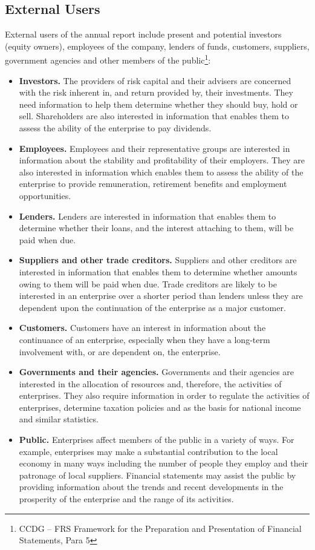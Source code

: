 \subsection{External Users}
External users of the annual report include present and potential investors (equity owners), employees of the company, lenders of funds, customers, suppliers, government agencies and other members of the public\footnote{CCDG – FRS Framework for the Preparation and Presentation of Financial Statements, Para 5}: 
\begin{itemize}
\item \textbf{Investors.} The providers of risk capital and their advisers are concerned with the risk inherent in, and return provided by, their investments.  They need information to help them determine whether they should buy, hold or sell.  Shareholders are also interested in information that enables them to assess the ability of the enterprise to pay dividends. 
\item \textbf{Employees.} Employees and their representative groups are interested in information about the stability and profitability of their employers.  They are also interested in information which enables them to assess the ability of the enterprise to provide remuneration, retirement benefits and employment opportunities. 
\item \textbf{Lenders.} Lenders are interested in information that enables them to determine whether their loans, and the interest attaching to them, will be paid when due. 
\item \textbf{Suppliers and other trade creditors.} Suppliers and other creditors are interested in information that enables them to determine whether amounts owing to them will be paid when due. Trade creditors are likely to be interested in an enterprise over a shorter period than lenders unless they are dependent upon the continuation of the enterprise as a major customer. 
\item \textbf{Customers.} Customers have an interest in information about the continuance of an enterprise, especially when they have a long-term involvement with, or are dependent on, the enterprise. 
\item \textbf{Governments and their agencies.} Governments and their agencies are interested in the allocation of resources and, therefore, the activities of enterprises.  They also require information in order to regulate the activities of enterprises, determine taxation policies and as the basis for national income and similar statistics. 
\item \textbf{Public.} Enterprises affect members of the public in a variety of ways.  For example, enterprises may make a substantial contribution to the local economy in many ways including the number of people they employ and their patronage of local suppliers.  Financial statements may assist the public by providing information about the trends and recent developments in the prosperity of the enterprise and the range of its activities.
\end{itemize}
